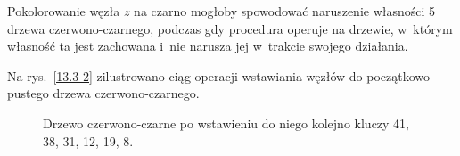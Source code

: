 
\exercise %
Pokolorowanie węzła $z$ na czarno mogłoby spowodować naruszenie własności 5 drzewa czerwono-czarnego, podczas gdy procedura  operuje na drzewie, w~którym własność ta jest zachowana i~nie narusza jej w~trakcie swojego działania.

\exercise %
Na rys.\ \ref{13.3-2} zilustrowano ciąg operacji wstawiania węzłów do początkowo pustego drzewa czerwono-czarnego.
\begin{figure}[ht]
	\centering 
	\caption{Drzewo czerwono-czarne po wstawieniu do niego kolejno kluczy 41, 38, 31, 12, 19, 8.} \label{fig:13.3-2}
\end{figure}

\exercise %
\exercise %
\exercise %
\exercise %

